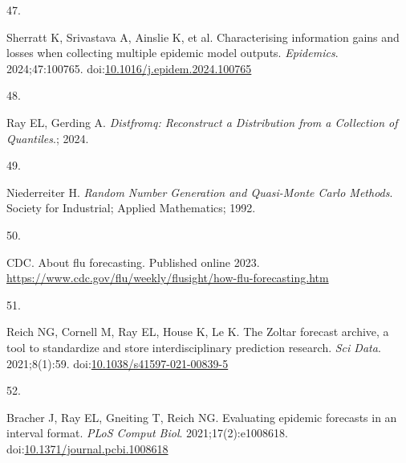 \documentclass[
]{article}
\newlength{\cslhangindent}
\newlength{\csllabelwidth}
\newenvironment{CSLReferences}[2] %
 {\begin{list}{}{%
  \setlength{\itemindent}{0pt}
  \setlength{\leftmargin}{0pt}
  \setlength{\parsep}{0pt}
  \ifodd #1
   \setlength{\leftmargin}{\cslhangindent}
   \setlength{\itemindent}{-1\cslhangindent}
  \fi
  \setlength{\itemsep}{#2\baselineskip}}}
 {\end{list}}
\newcommand{\CSLLeftMargin}[1]{\parbox[t]{\csllabelwidth}{\strut#1\strut}}
\newcommand{\CSLRightInline}[1]{\parbox[t]{\linewidth - \csllabelwidth}{\strut#1\strut}}
\begin{document}
\begin{CSLReferences}{0}{1}
\CSLLeftMargin{47. }%
\CSLRightInline{Sherratt K, Srivastava A, Ainslie K, et al.
Characterising information gains and losses when collecting multiple
epidemic model outputs. \emph{Epidemics}. 2024;47:100765.
doi:\href{https://doi.org/10.1016/j.epidem.2024.100765}{10.1016/j.epidem.2024.100765}}

\CSLLeftMargin{48. }%
\CSLRightInline{Ray EL, Gerding A. \emph{Distfromq: Reconstruct a
Distribution from a Collection of Quantiles}.; 2024.}

\CSLLeftMargin{49. }%
\CSLRightInline{Niederreiter H. \emph{Random Number Generation and
Quasi-Monte Carlo Methods}. Society for Industrial; Applied Mathematics;
1992.}

\CSLLeftMargin{50. }%
\CSLRightInline{CDC. About flu forecasting. Published online 2023.
\url{https://www.cdc.gov/flu/weekly/flusight/how-flu-forecasting.htm}}

\CSLLeftMargin{51. }%
\CSLRightInline{Reich NG, Cornell M, Ray EL, House K, Le K. The {Zoltar}
forecast archive, a tool to standardize and store interdisciplinary
prediction research. \emph{Sci Data}. 2021;8(1):59.
doi:\href{https://doi.org/10.1038/s41597-021-00839-5}{10.1038/s41597-021-00839-5}}

\CSLLeftMargin{52. }%
\CSLRightInline{Bracher J, Ray EL, Gneiting T, Reich NG. Evaluating
epidemic forecasts in an interval format. \emph{PLoS Comput Biol}.
2021;17(2):e1008618.
doi:\href{https://doi.org/10.1371/journal.pcbi.1008618}{10.1371/journal.pcbi.1008618}}

\end{CSLReferences}

\newpage
\end{document}
